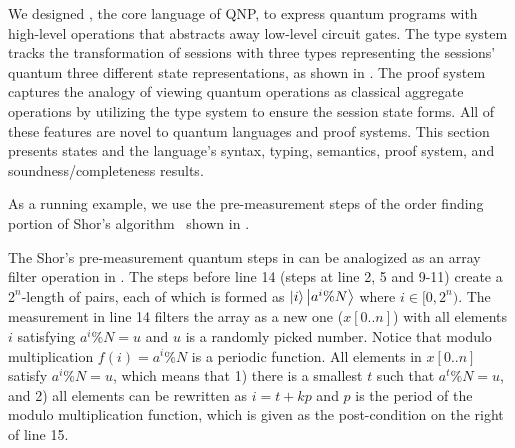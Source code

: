 We designed \qafny, the core language of QNP,
to express quantum programs with
high-level operations that abstracts away low-level circuit gates.
The \qafny type system tracks the transformation of sessions
with three types representing the sessions' quantum three different state representations, as shown in .
The \qafny proof system captures the analogy of viewing quantum 
operations as classical aggregate operations 
by utilizing the type system to ensure the session state forms.
All of these features are novel to quantum languages and proof systems. 
This section presents \qafny states and the language's syntax, typing, 
semantics, proof system, and soundness/completeness results.  

As a running example, we use the pre-measurement steps of the order finding portion of Shor's algorithm~\cite{Shor94} shown in . 
The Shor's pre-measurement quantum steps in  can be analogized as an array filter operation in .
The steps before line 14 (steps at line 2, 5 and 9-11) create a $2^n$-length of pairs, each of which is formed as $\left\vert{i}\right\rangle\left\vert{a^i \% N}\right\rangle$ where $i\in [0,2^n)$. The measurement in line 14 filters the array as a new one ($x[0..n]$) with all elements $i$ satisfying $a^i \% N=u$ and $u$ is a randomly picked number. Notice that modulo multiplication $f(i)=a^i\%N$ is a periodic function. All elements in $x[0..n]$ satisfy $a^i \% N=u$, which means that 1) there is a smallest $t$ such that $a^t \% N=u$, and 2) all elements can be rewritten as $i=t+kp$ and $p$ is the period of the modulo multiplication function, which is given as the post-condition on the right of line 15.
